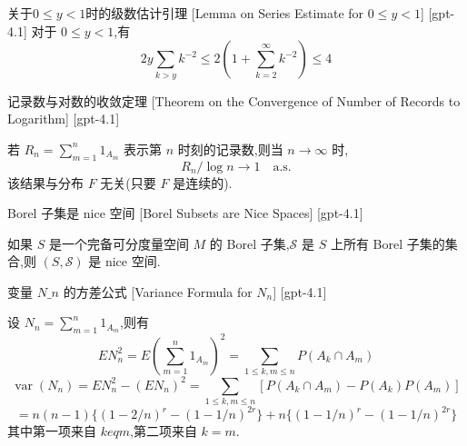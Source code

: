 \documentclass[UTF8]{ctexart}
\begin{document}
    
    
    \begin{lma}
        {关于$0 \leq y < 1$时的级数估计引理}
        [Lemma on Series Estimate for $0 \leq y < 1$]
        [gpt-4.1]
        对于 $0 \leq y < 1$,有
\[
2 y \sum_{k > y} k^{-2} \leq 2 \left( 1 + \sum_{k = 2}^{\infty} k^{-2} \right) \leq 4
\]

    \end{lma}
    
    
    
    \begin{thm}
        {记录数与对数的收敛定理}
        [Theorem on the Convergence of Number of Records to Logarithm]
        [gpt-4.1]
        
若 $R_{n} = \sum_{m=1}^n 1_{A_{m}}$ 表示第 $n$ 时刻的记录数,则当 $n \to \infty$ 时,
\[
R_{n} / \log n \to 1 \quad \text{a.s.}
\]
该结果与分布 $F$ 无关(只要 $F$ 是连续的).

    \end{thm}
    
    
    
    \begin{thm}
        {Borel 子集是 nice 空间}
        [Borel Subsets are Nice Spaces]
        [gpt-4.1]
        
如果 $S$ 是一个完备可分度量空间 $M$ 的 Borel 子集,$\mathcal{S}$ 是 $S$ 上所有 Borel 子集的集合,则 $(S, \mathcal{S})$ 是 nice 空间.

    \end{thm}
    
    
    
    \begin{ppt}
        {变量 $N\_n$ 的方差公式}
        [Variance Formula for $N_n$]
        [gpt-4.1]
        
设 $N_n = \sum_{m=1}^n 1_{A_m}$,则有
\[
E N_n^2 = E\left(\sum_{m=1}^n 1_{A_m}\right)^2 = \sum_{1 \leq k, m \leq n} P(A_k \cap A_m)
\]
\[
\operatorname{var}(N_n) = E N_n^2 - (E N_n)^2 = \sum_{1 \leq k, m \leq n} [P(A_k \cap A_m) - P(A_k) P(A_m)]
\]
\[
= n(n-1) \{ (1 - 2/n)^r - (1 - 1/n)^{2r} \} + n \{ (1 - 1/n)^r - (1 - 1/n)^{2r} \}
\]
其中第一项来自 $k 
eq m$,第二项来自 $k = m$.

    \end{ppt}
    
    
    
\end{document}
